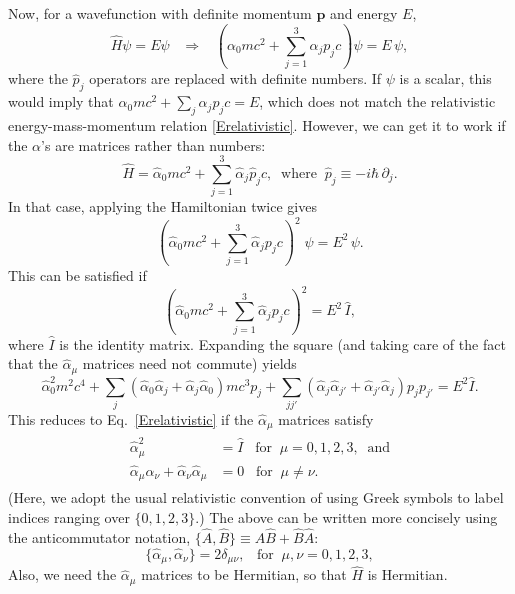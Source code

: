 \documentclass[pra,12pt]{revtex4}
\begin{document}
Now, for a wavefunction with definite momentum $\mathbf{p}$ and energy
$E$,
\begin{equation}
  \hat{H}\psi = E \psi \;\;\;\Rightarrow \;\;\;
  \left(\alpha_0mc^2 + \sum_{j=1}^3\alpha_j p_jc\right) \psi = E\,\psi,
\end{equation}
where the $\hat{p}_j$ operators are replaced with definite numbers.
If $\psi$ is a scalar, this would imply that $\alpha_0 mc^2 +
\sum_{j}\alpha_j p_j c = E$, which does not match the relativistic
energy-mass-momentum relation \eqref{Erelativistic}.  However, we can
get it to work if the $\alpha$'s are matrices rather than numbers:
\begin{equation}
\boxed{\qquad \hat{H} = \hat{\alpha}_0 mc^2 + \sum_{j=1}^3 \hat{\alpha}_j \hat{p}_j c, \;\; \mathrm{where}\;\; \hat{p}_j \equiv -i\hbar\, \partial_j.\qquad}
\label{Dirac}
\end{equation}
In that case, applying the Hamiltonian twice gives
\begin{equation}
  \left(\hat{\alpha}_0mc^2 + \sum_{j=1}^3\hat{\alpha}_j p_j c\right)^{\!2}\;
  \psi = E^2\,\psi.
\end{equation}
This can be satisfied if
\begin{equation}
  \left(\hat{\alpha}_0 mc^2 + \sum_{j=1}^3\hat{\alpha}_j p_j c\right)^2
  = E^2\, \hat{I},
\end{equation}
where $\hat{I}$ is the identity matrix.  Expanding the square (and
taking care of the fact that the $\hat{\alpha}_\mu$ matrices need not
commute) yields
\begin{equation}
  \hat{\alpha}_0^2 m^2c^4
  + \sum_j \left(\hat{\alpha}_0 \hat{\alpha}_j + \hat{\alpha}_j \hat{\alpha}_0\right) mc^3 p_j
  + \sum_{jj'} \left(\hat{\alpha}_j \hat{\alpha}_{j'} + \hat{\alpha}_{j'} \hat{\alpha}_j\right) p_j p_{j'} = E^2\hat{I}.
\end{equation}
This reduces to Eq.~\eqref{Erelativistic} if the $\hat{\alpha}_\mu$
matrices satisfy
\begin{align}
  \begin{aligned}
    \hat{\alpha}_\mu^2 &= \hat{I} \;\;\; \textrm{for} \;\;\mu=0,1,2,3,
    \;\;\textrm{and} \\
    \hat{\alpha}_\mu \hat{\alpha}_\nu
    + \hat{\alpha}_\nu \hat{\alpha}_\mu &= 0
    \;\;\; \textrm{for} \;\;\mu \ne \nu.
  \end{aligned}
\end{align}
(Here, we adopt the usual relativistic convention of using Greek
symbols to label indices ranging over $\{0,1,2,3\}$.)  The above can
be written more concisely using the anticommutator notation,
$\{\hat{A},\hat{B}\} \equiv \hat{A}\hat{B} + \hat{B}\hat{A}$:
\begin{equation}
  \{\hat{\alpha}_\mu, \hat{\alpha}_\nu\} = 2\delta_{\mu\nu},
  \;\;\; \textrm{for} \;\;\mu,\nu=0,1,2,3,
  \label{Dirac_anticomm}
\end{equation}
Also, we need the $\hat{\alpha}_\mu$ matrices to be Hermitian, so that
$\hat{H}$ is Hermitian.
\end{document}
